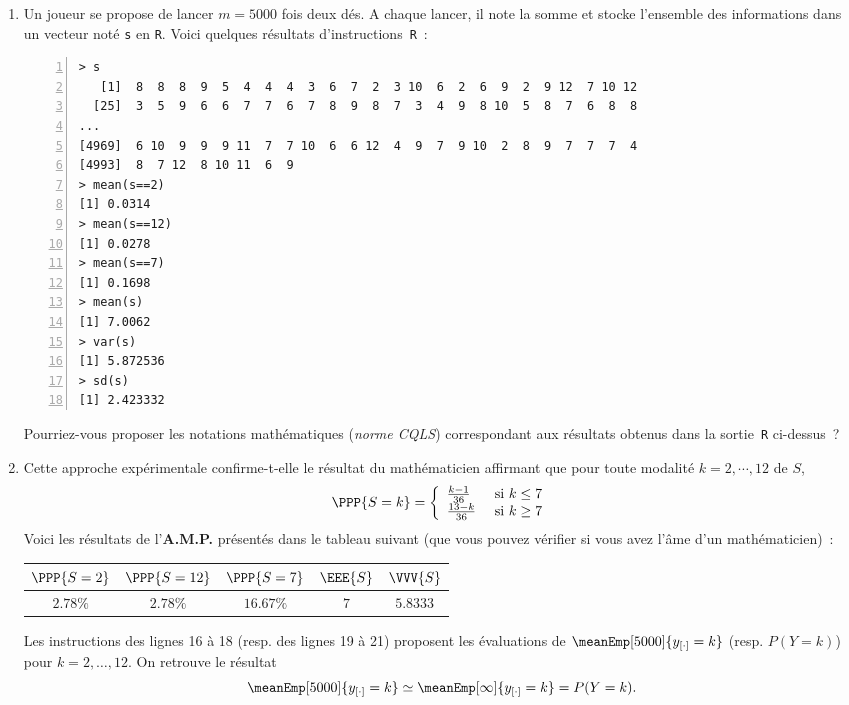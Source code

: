 \documentclass[10pt]{report}
\begin{document}
\begin{exercice}
\begin{enumerate}
\item Un joueur se propose de lancer $m=5000$ fois deux dés. A chaque lancer, il note la somme et stocke l'ensemble des informations dans un vecteur noté \texttt{s} en \texttt{R}. Voici quelques résultats d'instructions~\texttt{R}~:
\begin{Verbatim}[frame=leftline,fontfamily=tt,fontshape=n,numbers=left]
> s
   [1]  8  8  8  9  5  4  4  4  3  6  7  2  3 10  6  2  6  9  2  9 12  7 10 12
  [25]  3  5  9  6  6  7  7  6  7  8  9  8  7  3  4  9  8 10  5  8  7  6  8  8
...
[4969]  6 10  9  9  9 11  7  7 10  6  6 12  4  9  7  9 10  2  8  9  7  7  7  4
[4993]  8  7 12  8 10 11  6  9
> mean(s==2)
[1] 0.0314
> mean(s==12)
[1] 0.0278
> mean(s==7)
[1] 0.1698
> mean(s)
[1] 7.0062
> var(s)
[1] 5.872536
> sd(s)
[1] 2.423332
\end{Verbatim}

\noindent Pourriez-vous proposer les notations mathématiques (\textit{norme CQLS}) correspondant aux résultats obtenus dans la sortie~\texttt{R} ci-dessus~?

\item Cette approche expérimentale confirme-t-elle le résultat du mathématicien affirmant que pour toute modalité $k=2,\cdots,12$ de $S$,
$$
\PPP{S=k} = \left\{ \begin{array}{ll}
\frac{k-1}{36} & \mbox{ si } k\leq 7 \\
\frac{13-k}{36} & \mbox{ si } k \geq 7
\end{array} \right.
$$
Voici les résultats de l'\textbf{A.M.P.} présentés dans le tableau suivant (que vous pouvez vérifier si vous avez l'âme d'un mathématicien)~:

\begin{tabular}{|c|c|c|c|c|}\hline
\phantom{$\Big($}$\PPP{S=2}$&\phantom{$\Big($}$\PPP{S=12}$&\phantom{$\Big($}$\PPP{S=7}$&\phantom{$\Big($}$\EEE{S}$&\phantom{$\Big($}$\VVV{S}$
\\\hline
\phantom{$\Big($}$2.78\%$&\phantom{$\Big($}$2.78\%$&\phantom{$\Big($}$16.67\%$&\phantom{$\Big($}$7$&\phantom{$\Big($}$5.8333$
\\\hline
\end{tabular}


\begin{Correction}
Les instructions des lignes 16 à 18 (resp. des lignes 19 à 21) proposent les évaluations de $\meanEmp[5000]{y_{[\cdot]}=k}$ (resp. $P(Y=k)$) pour $k=2,\ldots,12$. On retrouve le résultat
$$
\meanEmp[5000]{y_{[\cdot]}=k} \simeq \meanEmp[\infty]{y_{[\cdot]}=k} = P(Y=k).
$$
\end{Correction}


\end{enumerate}
\end{exercice}
\end{document}
